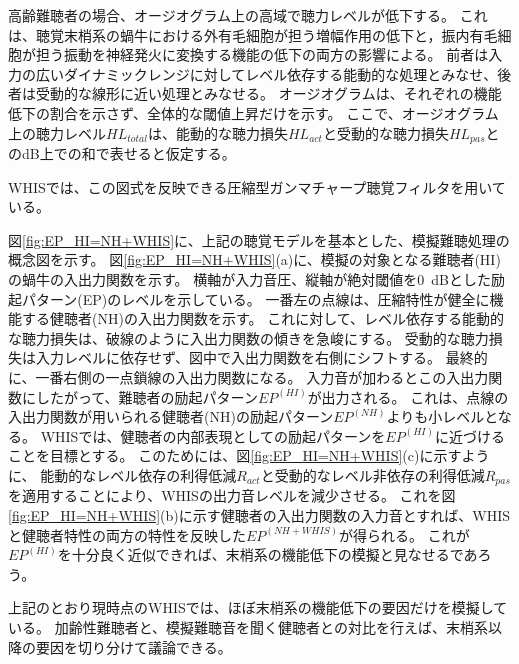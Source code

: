 高齢難聴者の場合、オージオグラム上の高域で聴力レベルが低下する。
これは、聴覚末梢系の蝸牛における外有毛細胞が担う増幅作用の低下と，振内有毛細胞が担う振動を神経発火に変換する機能の低下の両方の影響による。
前者は入力の広いダイナミックレンジに対してレベル依存する能動的な処理とみなせ、後者は受動的な線形に近い処理とみなせる。
オージオグラムは、それぞれの機能低下の割合を示さず、全体的な閾値上昇だけを示す。
ここで、オージオグラム上の聴力レベル$HL_{total}$は、能動的な聴力損失$HL_{act}$と受動的な聴力損失$HL_{pas}$とのdB上での和で表せると仮定する\cite{moore1997model}。

WHISでは、この図式を反映できる圧縮型ガンマチャープ聴覚フィルタ\cite{irino2001compressive,irino2006dynamic}を用いている。


図\ref{fig:EP_HI=NH+WHIS}に、上記の聴覚モデルを基本とした、模擬難聴処理の概念図を示す。
図\ref{fig:EP_HI=NH+WHIS}(a)に、模擬の対象となる難聴者(HI)の蝸牛の入出力関数を示す。
横軸が入力音圧、縦軸が絶対閾値を0~dBとした励起パターン(EP)のレベルを示している。
一番左の点線は、圧縮特性が健全に機能する健聴者(NH)の入出力関数を示す。
これに対して、レベル依存する能動的な聴力損失は、破線のように入出力関数の傾きを急峻にする。
受動的な聴力損失は入力レベルに依存せず、図中で入出力関数を右側にシフトする。
最終的に、一番右側の一点鎖線の入出力関数になる。
入力音が加わるとこの入出力関数にしたがって、難聴者の励起パターン$EP^{(HI)}$が出力される。
これは、点線の入出力関数が用いられる健聴者(NH)の励起パターン$EP^{(NH)}$よりも小レベルとなる。
WHISでは、健聴者の内部表現としての励起パターンを$EP^{(HI)}$に近づけることを目標とする。
このためには、図\ref{fig:EP_HI=NH+WHIS}(c)に示すように、
能動的なレベル依存の利得低減$R_{act}$と受動的なレベル非依存の利得低減$R_{pas}$を適用することにより、WHISの出力音レベルを減少させる。
これを図\ref{fig:EP_HI=NH+WHIS}(b)に示す健聴者の入出力関数の入力音とすれば、WHISと健聴者特性の両方の特性を反映した$EP^{(NH+WHIS)}$が得られる。
これが$EP^{(HI)}$を十分良く近似できれば、末梢系の機能低下の模擬と見なせるであろう。

上記のとおり現時点のWHISでは、ほぼ末梢系の機能低下の要因だけを模擬している。
加齢性難聴者と、模擬難聴音を聞く健聴者との対比を行えば、末梢系以降の要因を切り分けて議論できる。

